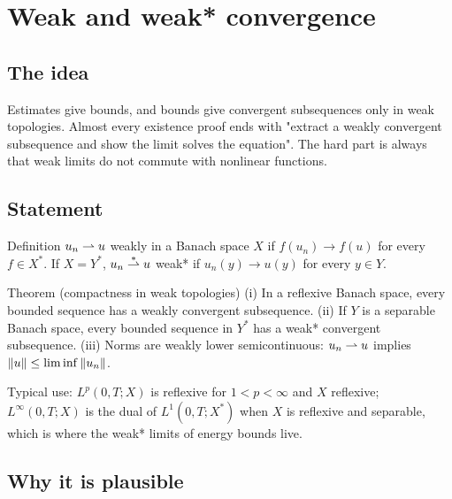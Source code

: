 
\section{Weak and weak* convergence}\label{p:weak-convergence}


\subsection*{The idea}

Estimates give bounds, and bounds give convergent subsequences only in weak topologies. Almost every existence proof ends with "extract a weakly convergent subsequence and show the limit solves the equation". The hard part is always that weak limits do not commute with nonlinear functions.

\subsection*{Statement}

\begin{defnbox}{Definition}
%
$u_n \rightharpoonup u$ weakly in a Banach space $X$ if $f(u_n)\to f(u)$ for every $f \in X^*$. If $X = Y^*$, $u_n \overset{*}{\rightharpoonup} u$ weak* if $u_n(y) \to u(y)$ for every $y \in Y$.
\end{defnbox}

\begin{thmbox}{Theorem (compactness in weak topologies)}
%
(i) In a reflexive Banach space, every bounded sequence has a weakly convergent subsequence. (ii) If $Y$ is a separable Banach space, every bounded sequence in $Y^*$ has a weak* convergent subsequence. (iii) Norms are weakly lower semicontinuous: $u_n \rightharpoonup u$ implies $\left\lVert u\right\rVert \le \liminf \left\lVert u_n\right\rVert$.
\end{thmbox}

Typical use: $L^p(0,T;X)$ is reflexive for $1< p< \infty$ and $X$ reflexive; $L^\infty(0,T;X)$ is the dual of $L^1(0,T;X^*)$ when $X$ is reflexive and separable, which is where the weak* limits of energy bounds live.

\subsection*{Why it is plausible}

